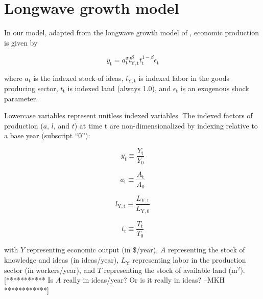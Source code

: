 \documentclass[letterpaper,12pt]{article}
\begin{document}

\section{Longwave growth model}
In our model, adapted from the longwave growth model of \citet{Jones2001}, economic production is given by

\begin{equation} \label{eq:Jones_production_function}
	y_\mathrm{t} = a_\mathrm{t} ^\sigma l_\mathrm{Y,t} ^\beta t_\mathrm{t} ^{1-\beta} \epsilon_\mathrm{t}
\end{equation}

\noindent where $a_\mathrm{t}$ is the indexed stock of ideas, $l_\mathrm{Y,t}$ is indexed labor in the goods producing sector, $t_\mathrm{t}$ is indexed land (always 1.0), and $\epsilon_\mathrm{t}$ is an exogenous shock parameter. 

Lowercase variables represent unitless indexed variables. The indexed factors of production ($a$, $l$, and $t$) at time $\mathrm{t}$ are non-dimensionalized by indexing relative to a base year (subscript ``0''):

\begin{equation} \label{eq:index_y}
	y_\mathrm{t} \equiv \frac{Y_\mathrm{t}}{Y_\mathrm{0}}
\end{equation}

\begin{equation} \label{eq:index_a}
	a_\mathrm{t} \equiv \frac{A_\mathrm{t}}{A_\mathrm{0}}
\end{equation}

\begin{equation} \label{eq:index_l}
	l_\mathrm{Y,t} \equiv \frac{L_\mathrm{Y,t}}{L_\mathrm{Y,0}}
\end{equation}

\begin{equation} \label{eq:index_t}
	t_\mathrm{t} \equiv \frac{T_\mathrm{t}}{T_\mathrm{0}}
\end{equation}

\noindent with $Y$ representing economic output (in \$/year), $A$ representing the stock of knowledge and ideas (in ideas/year), $L_\mathrm{Y}$ representing labor in the production sector (in workers/year), and $T$ representing the stock of available land ($\mathrm{m}^2$). [*********** Is $A$ really in ideas/year? Or is it really in ideas? --MKH ************]
\end{document}
